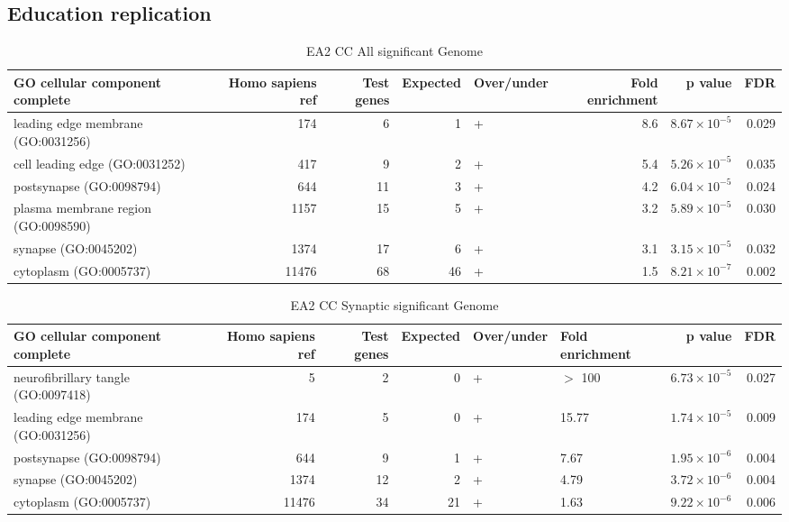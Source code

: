 \subsection{Education replication}
\begin{table}[ht]
\centering
\begin{adjustbox}{width=\textwidth}
\begin{tabular}{lrrrlrrr}
  \hline
GO cellular component complete & Homo sapiens ref & Test genes & Expected & Over/under & Fold enrichment & p value & FDR \\ 
  \hline
leading edge membrane (GO:0031256) & 174 & 6 & 1 & + & 8.6 & $8.67 \times 10^{-5}$ & 0.029 \\ 
  cell leading edge (GO:0031252) & 417 & 9 & 2 & + & 5.4 & $5.26 \times 10^{-5}$ & 0.035 \\ 
  postsynapse (GO:0098794) & 644 & 11 & 3 & + & 4.2 & $6.04 \times 10^{-5}$ & 0.024 \\ 
  plasma membrane region (GO:0098590) & 1157 & 15 & 5 & + & 3.2 & $5.89 \times 10^{-5}$ & 0.030 \\ 
  synapse (GO:0045202) & 1374 & 17 & 6 & + & 3.1 & $3.15 \times 10^{-5}$ & 0.032 \\ 
  cytoplasm (GO:0005737) & 11476 & 68 & 46 & + & 1.5 & $8.21 \times 10^{-7}$ & 0.002 \\ 
   \hline
\end{tabular}
\end{adjustbox}
\caption{EA2 CC All significant Genome} 
\label{tab:EA2 CC All significant Genome}
\end{table}

\begin{table}[ht]
\centering
\begin{adjustbox}{width=\textwidth}
\begin{tabular}{lrrrllrr}
  \hline
GO cellular component complete & Homo sapiens ref & Test genes & Expected & Over/under & Fold enrichment & p value & FDR \\ 
  \hline
neurofibrillary tangle (GO:0097418) & 5 & 2 & 0 & + & $>$ 100 & $6.73 \times 10^{-5}$ & 0.027 \\ 
  leading edge membrane (GO:0031256) & 174 & 5 & 0 & + & 15.77 & $1.74 \times 10^{-5}$ & 0.009 \\ 
  postsynapse (GO:0098794) & 644 & 9 & 1 & + & 7.67 & $1.95 \times 10^{-6}$ & 0.004 \\ 
  synapse (GO:0045202) & 1374 & 12 & 2 & + & 4.79 & $3.72 \times 10^{-6}$ & 0.004 \\ 
  cytoplasm (GO:0005737) & 11476 & 34 & 21 & + & 1.63 & $9.22 \times 10^{-6}$ & 0.006 \\ 
   \hline
\end{tabular}
\end{adjustbox}
\caption{EA2 CC Synaptic significant Genome} 
\label{tab:EA2 CC Synaptic significant Genome}
\end{table}


